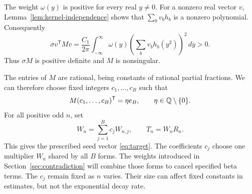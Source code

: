 The weight $\omega(y)$ is positive for every real $y\ne0$.
For a nonzero real vector $v$, Lemma~\ref{lem:kernel-independence}
shows that $\sum_bv_bh_b$ is a nonzero polynomial. Consequently
\[
 \sigma v^{\mathsf T}Mv
 =\frac{C_1}{2\pi}\int_{-\infty}^{\infty}
      \omega(y)\left(\sum_bv_bh_b(y^2)\right)^2\,dy>0.
\]
Thus $\sigma M$ is positive definite and $M$ is nonsingular.

The entries of $M$ are rational, being constants of rational partial
fractions. We can therefore choose fixed integers $c_1,\ldots,c_B$
such that
\[
 M(c_1,\ldots,c_B)^{\mathsf T}=\eta e_B,\qquad \eta\in\mathbb Q\setminus\{0\}.
\]
For all positive odd $n$, set
\begin{equation}\label{eq:T}
 W_n=\sum_{j=1}^B c_jW_{n,j},\qquad T_n=W_nR_n.
\end{equation}
This gives the prescribed seed vector \eqref{eq:target}. The
coefficients $c_j$ choose one multiplier $W_n$ shared by all $B$
forms. The weights introduced in Section~\ref{sec:contradiction}
will combine those forms to cancel specified beta terms.
The $c_j$ remain fixed as $n$ varies. Their size can affect
fixed constants in estimates, but not the exponential decay rate.
